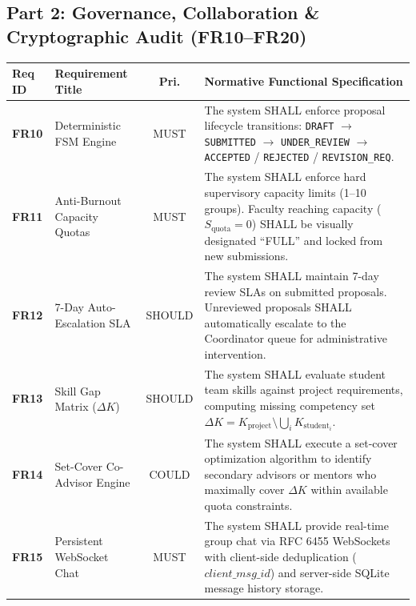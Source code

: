 \documentclass[10.5pt,a4paper]{article}
\begin{document}
\clearpage

\subsection{Part 2: Governance, Collaboration \& Cryptographic Audit (FR10--FR20)}

\begin{table}[h]
\centering
\small
\begin{tabularx}{\linewidth}{|l|l|c|X|}
\hline
\rowcolor{headergray} \textbf{Req ID} & \textbf{Requirement Title} & \textbf{Pri.} & \textbf{Normative Functional Specification} \\ \hline
\textbf{FR10} & Deterministic FSM Engine & MUST & The system SHALL enforce proposal lifecycle transitions: \texttt{DRAFT} $\rightarrow$ \texttt{SUBMITTED} $\rightarrow$ \texttt{UNDER\_REVIEW} $\rightarrow$ \texttt{ACCEPTED} / \texttt{REJECTED} / \texttt{REVISION\_REQ}. \\ \hline
\textbf{FR11} & Anti-Burnout Capacity Quotas & MUST & The system SHALL enforce hard supervisory capacity limits (1--10 groups). Faculty reaching capacity ($S_{\text{quota}} = 0$) SHALL be visually designated ``FULL'' and locked from new submissions. \\ \hline
\textbf{FR12} & 7-Day Auto-Escalation SLA & SHOULD & The system SHALL maintain 7-day review SLAs on submitted proposals. Unreviewed proposals SHALL automatically escalate to the Coordinator queue for administrative intervention. \\ \hline
\textbf{FR13} & Skill Gap Matrix ($\Delta K$) & SHOULD & The system SHALL evaluate student team skills against project requirements, computing missing competency set $\Delta K = K_{\text{project}} \setminus \bigcup_{i} K_{\text{student}_i}$. \\ \hline
\textbf{FR14} & Set-Cover Co-Advisor Engine & COULD & The system SHALL execute a set-cover optimization algorithm to identify secondary advisors or mentors who maximally cover $\Delta K$ within available quota constraints. \\ \hline
\textbf{FR15} & Persistent WebSocket Chat & MUST & The system SHALL provide real-time group chat via RFC 6455 WebSockets with client-side deduplication ($client\_msg\_id$) and server-side SQLite message history storage. \\ \hline

\end{tabularx}
\end{table}
\end{document}
